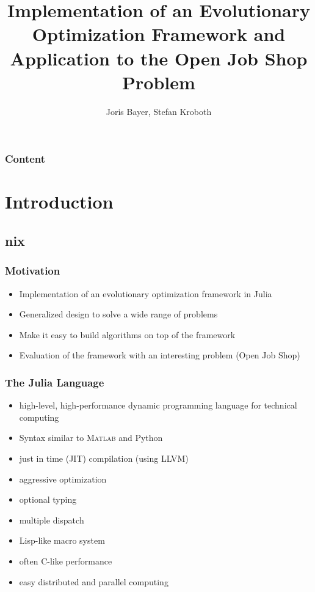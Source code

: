 \documentclass[%
14pt
]{beamer}
\title{Implementation of an Evolutionary Optimization Framework and Application to the Open Job Shop Problem}
\author{Joris Bayer, Stefan Kroboth}
\begin{document}

\begin{frame}[plain]
  \frametitle{}
  \titlepage %
\end{frame}



\begin{frame}
  \frametitle{Content}
        \tableofcontents[hideallsubsections %
                        ] %
\end{frame}

\section{Introduction}
\subsection{nix}
\begin{frame}
  \frametitle{Motivation}
  \begin{itemize}
    \item Implementation of an evolutionary optimization framework in Julia
    \item Generalized design to solve a wide range of problems
    \item Make it easy to build algorithms on top of the framework
    \item Evaluation of the framework with an interesting problem (Open Job Shop)
  \end{itemize}
\end{frame}

\begin{frame}
  \frametitle{The Julia Language}
  \begin{itemize}
    \item high-level, high-performance dynamic programming language for technical computing
    \item Syntax similar to \textsc{Matlab} and Python
    \item just in time (JIT) compilation (using LLVM)
    \item aggressive optimization
    \item optional typing
    \item multiple dispatch
    \item Lisp-like macro system
    \item often C-like performance
    \item easy distributed and parallel computing
  \end{itemize}
\end{frame}
\end{document}
